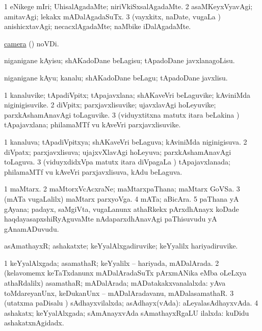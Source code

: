 \bentry
{}
\gl{\kirxvi}
\bmng
\bnum
\num{1} eNikege mIri; UhisalAgadaMte; niriVkiSxsalAgadaMte. 
\num{2} asaMKeyxVyavAgi; amitavAgi; lekakx mADalAgadaSuTx. 
\num{3} (vayxkitx, naDate, \mo vugaLa \vi) anishicxtavAgi; necacxlAgadaMte; naMbike iDalAgadaMte. 
\enum
\emng
\eentry

\bentry
{}
\gl{\kirxvi}
\bmng
\hyperref{kandict_c.pdf}{C}{camera}{camera} (\nuga) noVDi. 
\emng
\eentry

\bentry
{}
\gl{\sakirx}
\bmng
niganigane kAyisu; shAKadoDane beLagisu; tApadoDane javxlanagoLisu. 
\emng

\noindent
\gl{\akirx}
\bmng
niganigane kAyu; kanalu; shAKadoDane beLagu; tApadoDane javxlisu. 
\emng
\eentry

\bentry
{}
\gl{\nA}
\bmng
\bnum
\num{1} kanaluvike; tApadiVpitx; tApajavxlana; shAKaveVri beLaguvike; kAviniMda niginigisuvike. 
\num{2} diVpitx; parxjavxlisuvike; ujavxlavAgi hoLeyuvike; parxkAshamAnavAgi toLaguvike. 
\num{3} (viduyxtitxna matutx itara beLakina \vi) tApajavxlana; philamaMTf \mo vu kAveVri parxjavxlisuvike. 
\enum
\emng
\eentry

\bentry
{}
\gl{\gu}
\bmng
\bnum
\num{1} kanaluva; tApadiVpitxya; shAKaveVri beLaguva; kAviniMda niginigisuva. 
\num{2} diVpatx; parxjavxlisuva; ujajxvXlavAgi hoLeyuva; parxkAshamAnavAgi toLaguva. 
\num{3} (viduyxdidxVpa matutx itara diVpagaLa \vi) tApajavxlanada; philamaMTf \mo vu kAveVri parxjavxlisuva, kAdu beLaguva. 
\enum
\emng
\eentry

\bentry
{}
\gl{\nA}
\bmng
\bnum
\num{1} maMtarx. 
\num{2} maMtorxVcAcxraNe; maMtarxpaThana; maMtarx GoVSa. 
\num{3} (mATa \mo vugaLalilx) maMtarx parxyoVga. 
\num{4} mATa; aBicAra. 
\num{5} paThana yA gAyana; padayx, saMgiVta, \mo vugaLanunx athaRkekx pArxdhAnayx koDade haqdayasapxshiRyAguvaMte nAdaparxdhAnavAgi paThisuvudu yA gAnamADuvudu. 
\enum
\emng
\eentry

\bentry
{}
\gl{\nA}
\bmng
asAmathayxR; ashakatxte; keYyalAlxgadiruvike; keYyalilx hariyadiruvike. 
\emng
\eentry

\bentry
{}
\gl{\gu}
\bmng
\bnum
\num{1} keYyalAlxgada; asamathaR; keYyalilx -- hariyada, mADalArada. 
\num{2} (kelavomemx keTaTxdanunx mADalAradaSuTx pArxmANika eMba oLeLxya athaRdalilx) asamathaR; mADalArada; mADatakakxvanalalxda:  yAva toMdareyanUnx, keDukanUnx -- mADalAradavanu, mADalasamathaR. 
\num{3} (utatxma paDisalu \mo) sAdhayxvilalxda; asAdhayx(vAda):  aLeyalasAdhayxvAda. 
\num{4} ashakatx; keYyalAlxgada; sAmAnayxvAda sAmathayxRgaLU ilalxda:  kuDidu ashakatxnAgidadx. 
\enum
\emng
\eentry

